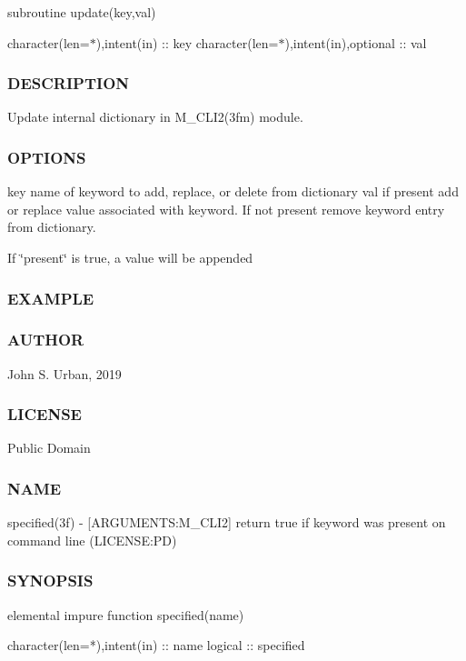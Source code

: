 subroutine update(key,val)

character(len=$\ast$),intent(in) \+:\+: key character(len=$\ast$),intent(in),optional \+:\+: val \subsubsection*{D\+E\+S\+C\+R\+I\+P\+T\+I\+ON}

Update internal dictionary in M\+\_\+\+C\+L\+I2(3fm) module. \subsubsection*{O\+P\+T\+I\+O\+NS}

key name of keyword to add, replace, or delete from dictionary val if present add or replace value associated with keyword. If not present remove keyword entry from dictionary.

If \char`\"{}present\char`\"{} is true, a value will be appended \subsubsection*{E\+X\+A\+M\+P\+LE}

\subsubsection*{A\+U\+T\+H\+OR}

John S. Urban, 2019 \subsubsection*{L\+I\+C\+E\+N\+SE}

Public Domain \subsubsection*{N\+A\+ME}

specified(3f) -\/ \mbox{[}A\+R\+G\+U\+M\+E\+N\+TS\+:M\+\_\+\+C\+L\+I2\mbox{]} return true if keyword was present on command line (L\+I\+C\+E\+N\+SE\+:PD)

\subsubsection*{S\+Y\+N\+O\+P\+S\+IS}

\begin{DoxyVerb}elemental impure function specified(name)

 character(len=*),intent(in) :: name
 logical :: specified
\end{DoxyVerb}


